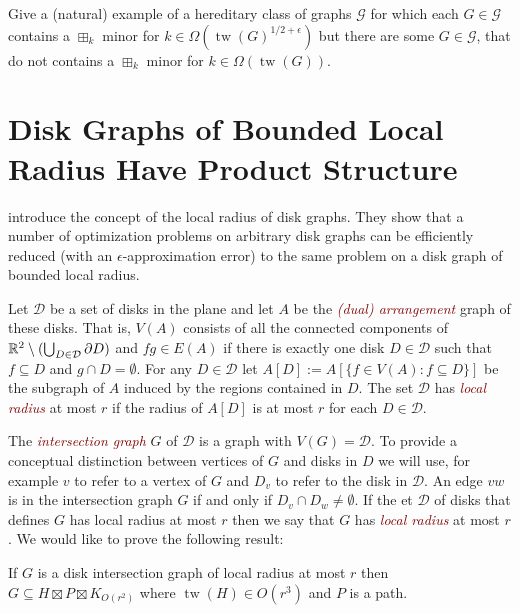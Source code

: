 \documentclass{patmorin}
\newcommand{\defin}[1]{\textcolor{Maroon}{\emph{#1}}}
\DeclareMathOperator{\tw}{tw}
\begin{document}
\begin{op}
  Give a (natural) example of a hereditary class of graphs $\mathcal{G}$ for which each $G\in\mathcal{G}$ contains a $\boxplus_k$ minor for $k\in\Omega(\tw(G)^{1/2+\epsilon})$ but there are some $G\in\mathcal{G}$, that do not contains a $\boxplus_k$ minor for $k\in\Omega(\tw(G))$.
\end{op}


\newpage
\section{Disk Graphs of Bounded Local Radius Have Product Structure}

\citet{lokshtanov.panolan:framework} introduce the concept of the local radius of disk graphs.  They show that a number of optimization problems on arbitrary disk graphs can be efficiently reduced (with an $\epsilon$-approximation error) to the same problem on a disk graph of bounded local radius.

Let $\mathcal{D}$ be a set of disks in the plane and let $A$ be the \defin{(dual) arrangement} graph of these disks.  That is, $V(A)$ consists of all the connected components of $\mathbb{R}^2\setminus(\bigcup_{D\in\mathcal{D}}\partial D)$ and $fg\in E(A)$ if there is exactly one disk $D\in\mathcal{D}$ such that $f\subseteq D$ and $g\cap D=\emptyset$.  For any $D\in\mathcal{D}$ let $A[D]:=A[\{f\in V(A): f\subseteq D\}]$ be the subgraph of $A$ induced by the regions contained in $D$.  The set $\mathcal{D}$ has \defin{local radius} at most $r$ if the radius of $A[D]$ is at most $r$ for each $D\in\mathcal{D}$.

The \defin{intersection graph} $G$ of $\mathcal{D}$ is a graph with $V(G)=\mathcal{D}$. To provide a conceptual distinction between vertices of $G$ and disks in $D$ we will use, for example $v$ to refer to a vertex of $G$ and $D_v$ to refer to the disk in $\mathcal{D}$.  An edge $vw$ is in the intersection graph $G$ if and only if $D_v\cap D_w\neq\emptyset$.  If the et $\mathcal{D}$ of disks that defines $G$ has local radius at most $r$ then we say that $G$ has \defin{local radius} at most $r$.  We would like to prove the following result:

\begin{thm}\label{radius_product}
   If $G$ is a disk intersection graph of local radius at most $r$ then  $G\subseteq H\boxtimes P\boxtimes K_{O(r^2)}$ where $\tw(H)\in O(r^3)$ and $P$ is a path.
\end{thm}
\end{document}
